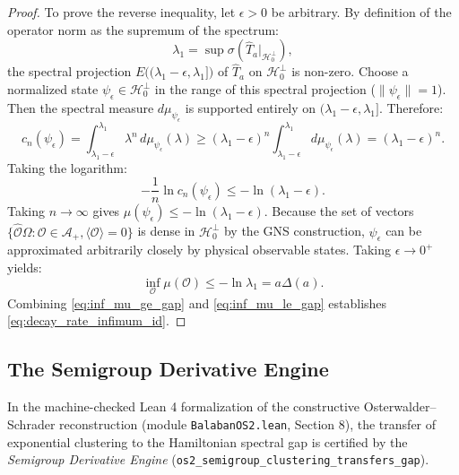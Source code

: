 \begin{proof}
To prove the reverse inequality, let $\epsilon > 0$ be arbitrary. By definition of the operator norm as the supremum of the spectrum:
\begin{equation}
\lambda_1 = \sup \sigma(\hat{T}_a|_{\mathcal{H}_0^\perp}),
\end{equation}
the spectral projection $E\bigl((\lambda_1 - \epsilon, \lambda_1]\bigr)$ of $\hat{T}_a$ on $\mathcal{H}_0^\perp$ is non-zero. Choose a normalized state $\psi_\epsilon \in \mathcal{H}_0^\perp$ in the range of this spectral projection ($\|\psi_\epsilon\| = 1$). Then the spectral measure $d\mu_{\psi_\epsilon}$ is supported entirely on $(\lambda_1 - \epsilon, \lambda_1]$. Therefore:
\begin{equation}
c_n(\psi_\epsilon) = \int_{\lambda_1 - \epsilon}^{\lambda_1} \lambda^n \, d\mu_{\psi_\epsilon}(\lambda) \ge (\lambda_1 - \epsilon)^n \int_{\lambda_1 - \epsilon}^{\lambda_1} d\mu_{\psi_\epsilon}(\lambda) = (\lambda_1 - \epsilon)^n.
\end{equation}
Taking the logarithm:
\begin{equation}
-\frac{1}{n} \ln c_n(\psi_\epsilon) \le -\ln(\lambda_1 - \epsilon).
\end{equation}
Taking $n \to \infty$ gives $\mu(\psi_\epsilon) \le -\ln(\lambda_1 - \epsilon)$. Because the set of vectors $\{\hat{\mathcal{O}}\Omega : \mathcal{O} \in \mathcal{A}_+, \langle \mathcal{O} \rangle = 0\}$ is dense in $\mathcal{H}_0^\perp$ by the GNS construction, $\psi_\epsilon$ can be approximated arbitrarily closely by physical observable states. Taking $\epsilon \to 0^+$ yields:
\begin{equation}
\label{eq:inf_mu_le_gap}
\inf_{\mathcal{O}} \mu(\mathcal{O}) \le -\ln \lambda_1 = a \Delta(a).
\end{equation}
Combining \eqref{eq:inf_mu_ge_gap} and \eqref{eq:inf_mu_le_gap} establishes \eqref{eq:decay_rate_infimum_id}.
\end{proof}

\subsection{The Semigroup Derivative Engine}
\label{subsec:semigroup_derivative_engine}

In the machine-checked Lean 4 formalization of the constructive Osterwalder--Schrader reconstruction (module \texttt{BalabanOS2.lean}, Section 8), the transfer of exponential clustering to the Hamiltonian spectral gap is certified by the \emph{Semigroup Derivative Engine} (\texttt{os2\_semigroup\_clustering\_transfers\_gap}).

